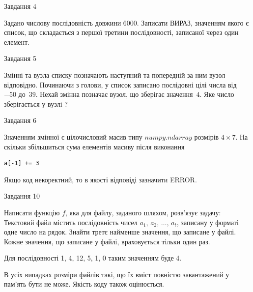 \documentclass[12pt, ukrainian]{article}
\begin{document}
{               
{\begin{center}Завдання {4}\end{center}}
\vspace{-6mm}

 Задано числову послідовність  довжини 6000. Записати ВИРАЗ, значенням якого є список, що складається з першої третини послідовності, записаної через один елемент.\par

\vspace{10mm}
               
{\begin{center}Завдання {5}\end{center}}
\vspace{-6mm}
Змінні  та  вузла списку позначають наступний та попередній за ним вузол відповідно. Починаючи з голови, у список записано послідовні цілі числа від~$-50$ до~$39$. Нехай змінна  позначає вузол, що зберігає значення~$4$.
Яке число зберігається у вузлі  ?\par

               
{\begin{center}Завдання {6}\end{center}}
\vspace{-6mm}
Значенням змінної  є цілочисловий масив типу $numpy.ndarray$ розмірів $4{\times}7$. На скільки збільшиться сума елементів масиву  після виконання
\begin{verbatim}
a[-1] += 3
\end{verbatim}


Якщо код некоректний, то в якості відповіді зазначити ERROR.\par

               
{\begin{center}Завдання {10}\end{center}}
\vspace{-6mm}

Написати функцію $f$, яка для файлу, заданого шляхом, розв’язує задачу:\\ Текстовий файл містить послідовність чисел $a_1$, $a_2$, $\ldots$, $a_t$, записану у форматі одне число на рядок. Знайти третє найменше значення, що записане у файлі. Кожне значення, що записане у файлі, враховується тільки один раз. \par
Для послідовності 1, 4, 12, 5, 1, 0 таким значенням буде 4.

В усіх випадках розміри файлів такі, що їх вміст повністю завантажений у пам'ять бути не може. Якість коду також оцінюється.



}
\end{document}
